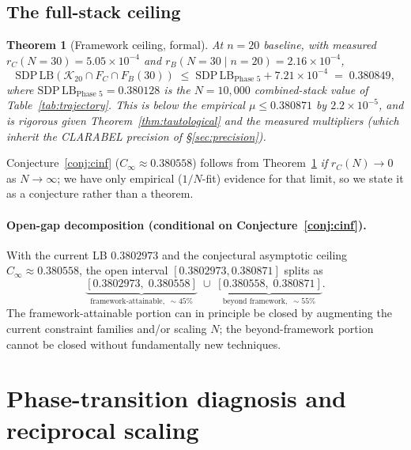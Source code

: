 \documentclass[11pt]{article}
\theoremstyle{plain}
\newtheorem{theorem}{Theorem}
\theoremstyle{definition}
\begin{document}
\subsection{The full-stack ceiling}

\begin{theorem}[Framework ceiling, formal]\label{thm:saturation-formal}
At $n = 20$ baseline, with measured $r_C(N = 30) = 5.05 \times 10^{-4}$
and $r_B(N = 30 \mid n = 20) = 2.16 \times 10^{-4}$,
\[
\mathrm{SDP\,LB}(\mathcal{K}_{20} \cap F_C \cap F_B(30))
\;\le\; \mathrm{SDP\,LB}_{\text{Phase 5}} + 7.21 \times 10^{-4}
\;=\; 0.380849,
\]
where $\mathrm{SDP\,LB}_{\text{Phase 5}} = 0.380128$ is the
$N = 10{,}000$ combined-stack value of Table~\ref{tab:trajectory}.
This is below the empirical $\mu \le 0.380871$ by $2.2 \times 10^{-5}$,
and is rigorous given Theorem~\ref{thm:tautological} and the measured
multipliers (which inherit the CLARABEL precision of
\S\ref{sec:precision}).
\end{theorem}


Conjecture~\ref{conj:cinf} ($C_\infty \approx 0.380558$) follows from
Theorem~\ref{thm:saturation-formal} \emph{if} $r_C(N) \to 0$ as
$N \to \infty$; we have only empirical ($1/N$-fit) evidence for that
limit, so we state it as a conjecture rather than a theorem.

\paragraph{Open-gap decomposition (conditional on Conjecture~\ref{conj:cinf}).}
With the current LB $0.3802973$ and the conjectural asymptotic ceiling
$C_\infty \approx 0.380558$, the open interval $[0.3802973, 0.380871]$
splits as
\[
\underbrace{[0.3802973,\; 0.380558]}_{\text{framework-attainable},\;\sim 45\%}
\;\cup\;
\underbrace{[0.380558,\; 0.380871]}_{\text{beyond framework},\;\sim 55\%}.
\]
The framework-attainable portion can in principle be closed by
augmenting the current constraint families and/or scaling $N$; the
beyond-framework portion cannot be closed without fundamentally new
techniques.

\section{Phase-transition diagnosis and reciprocal scaling}\label{sec:phase-transition}
\end{document}

